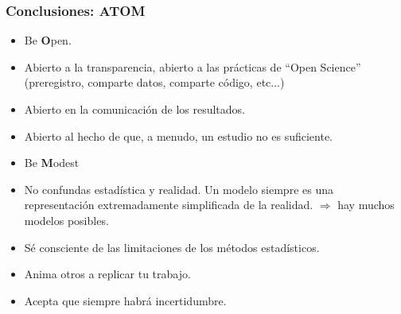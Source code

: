 \documentclass[9pt]{beamer}
\begin{document}
\begin{frame}
  \frametitle{Conclusiones: ATOM}

  \begin{block}{}
  \begin{itemize}
  \item Be \textbf{\Huge O}pen.
  \end{itemize}
\end{block}

\begin{itemize}
\item<2-> Abierto a la transparencia, abierto a las prácticas de
  ``Open Science'' (preregistro, comparte datos, comparte código, etc...)
\item<3-> Abierto en la comunicación de los resultados.
\item<4-> Abierto al hecho de que, a menudo, un estudio no es suficiente. 
\end{itemize}
\begin{block}{}
  \begin{itemize}
  \item Be \textbf{\Huge M}odest
  \end{itemize}
  
\end{block}
\begin{itemize}
\item<6-> No confundas estadística y realidad. Un modelo siempre es
  una representación extremadamente simplificada de la
  realidad. $\Rightarrow$ hay muchos modelos posibles.
\item<7-> Sé consciente de las limitaciones de los métodos estadísticos.
\item<8-> Anima otros a replicar tu trabajo.

\item<9-> Acepta que siempre habrá incertidumbre.
\end{itemize}

\end{frame}
\end{document}

